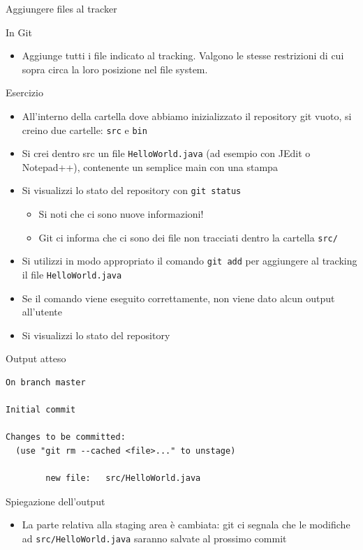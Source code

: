 \documentclass[presentation]{beamer}
\begin{document}
\begin{frame}{Aggiungere files al tracker}
\begin{block}{In Git}
\begin{itemize}
			\begin{itemize}
				\item Aggiunge tutti i file indicato al tracking. Valgono le stesse restrizioni di cui sopra circa la loro posizione nel file system.
			\end{itemize}
		\end{itemize}
	\end{block}
	\begin{block}{Esercizio}	
		\begin{itemize}
			\item All'interno della cartella dove abbiamo inizializzato il repository git vuoto, si creino due cartelle: \texttt{src} e \texttt{bin}
			\item Si crei dentro src un file \texttt{HelloWorld.java} (ad esempio con JEdit o Notepad++), contenente un semplice main con una stampa
			\item Si visualizzi lo stato del repository con \texttt{git status}
			\begin{itemize}
				\item Si noti che ci sono nuove informazioni!
				\item Git ci informa che ci sono dei file non tracciati dentro la cartella \texttt{src/}
			\end{itemize}
			\item Si utilizzi in modo appropriato il comando \texttt{git add} per aggiungere al tracking il file \texttt{HelloWorld.java}
			\item Se il comando viene eseguito correttamente, non viene dato alcun output all'utente
			\item Si visualizzi lo stato del repository
		\end{itemize}
	\end{block}
	\begin{block}{Output atteso}
		\begin{Verbatim}[fontsize=\scriptsize]
On branch master

Initial commit

Changes to be committed:
  (use "git rm --cached <file>..." to unstage)

        new file:   src/HelloWorld.java	 
			\end{Verbatim}
	\end{block}
	\begin{block}{Spiegazione dell'output}
		\begin{itemize}
			\item La parte relativa alla staging area è cambiata: git ci segnala che le modifiche ad \texttt{src/HelloWorld.java} saranno salvate al prossimo commit
		\end{itemize}
	\end{block}
\end{frame}
\end{document}
